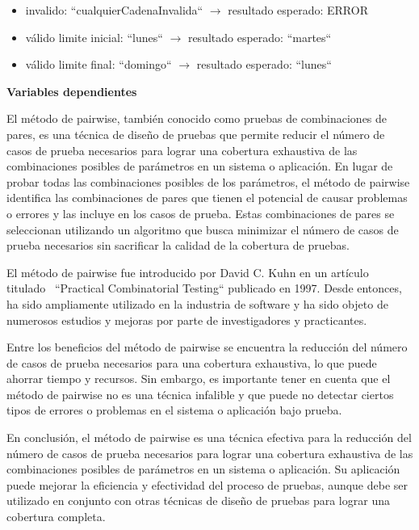 \begin{itemize}
    \item invalido: “cualquierCadenaInvalida“ \(\longrightarrow\) resultado esperado: ERROR
    \item válido limite inicial: “lunes“ \(\longrightarrow\) resultado esperado: “martes“
    \item válido limite final: “domingo“ \(\longrightarrow\) resultado esperado: “lunes“
\end{itemize}

\textbf{Variables dependientes}

El método de pairwise, también conocido como pruebas de combinaciones de pares, es una técnica de diseño de pruebas que permite reducir el número de casos de prueba necesarios para lograr una cobertura exhaustiva de las combinaciones posibles de parámetros en un sistema o aplicación. En lugar de probar todas las combinaciones posibles de los parámetros, el método de pairwise identifica las combinaciones de pares que tienen el potencial de causar problemas o errores y las incluye en los casos de prueba. Estas combinaciones de pares se seleccionan utilizando un algoritmo que busca minimizar el número de casos de prueba necesarios sin sacrificar la calidad de la cobertura de pruebas.

El método de pairwise fue introducido por David C. Kuhn en un artículo titulado~\cite{37051} “Practical Combinatorial Testing“ publicado en 1997. Desde entonces, ha sido ampliamente utilizado en la industria de software y ha sido objeto de numerosos estudios y mejoras por parte de investigadores y practicantes.

Entre los beneficios del método de pairwise se encuentra la reducción del número de casos de prueba necesarios para una cobertura exhaustiva, lo que puede ahorrar tiempo y recursos. Sin embargo, es importante tener en cuenta que el método de pairwise no es una técnica infalible y que puede no detectar ciertos tipos de errores o problemas en el sistema o aplicación bajo prueba.

En conclusión, el método de pairwise es una técnica efectiva para la reducción del número de casos de prueba necesarios para lograr una cobertura exhaustiva de las combinaciones posibles de parámetros en un sistema o aplicación. Su aplicación puede mejorar la eficiencia y efectividad del proceso de pruebas, aunque debe ser utilizado en conjunto con otras técnicas de diseño de pruebas para lograr una cobertura completa.

